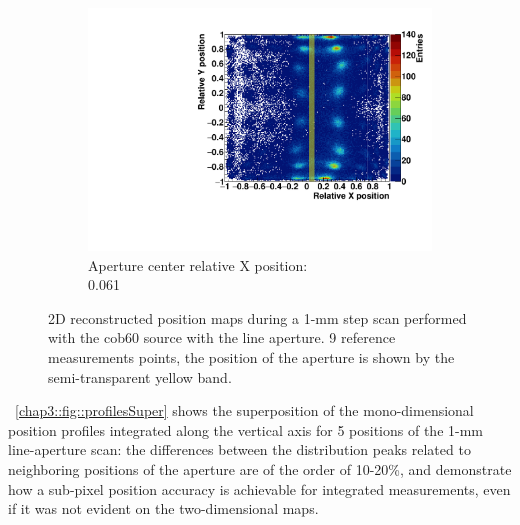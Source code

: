 \begin{figure}
\begin{subfigure}[t]{0.32\textwidth}
\centering
\includegraphics[width=\textwidth]{03_GraphicFiles/chapter3_CLaRySproto/Absorber/images_scan/line_1mm/run00022_floodMap.pdf}
\caption{Aperture center relative X position: \\ 0.061}
\label{chap3::fig::scan_map9_1mm}
\end{subfigure}
\caption{2D reconstructed position maps during a 1-mm step scan performed with the \gls{cob60} source with the line aperture. 9 reference measurements points, the position of the aperture is shown by the semi-transparent yellow band.}
\label{chap3::fig::ScanFloodMap_1mm}
\end{figure}

\figurename~\ref{chap3::fig::profilesSuper} shows the superposition of the mono-dimensional position profiles integrated along the vertical axis for 5 positions of the 1-mm line-aperture scan: the differences between the distribution peaks related to neighboring positions of the aperture are of the order of 10-20\%, and demonstrate how a sub-pixel position accuracy is achievable for integrated measurements, even if it was not evident on the two-dimensional maps.

